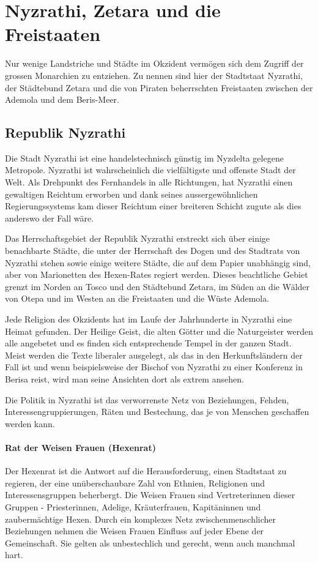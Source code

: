 \documentclass[12pt,twoside,twocolumn,openany]{book}
\begin{document}
\chapter{Nyzrathi, Zetara und die Freistaaten}
Nur wenige Landstriche und Städte im Okzident vermögen sich dem Zugriff der grossen Monarchien zu entziehen. Zu nennen sind hier der Stadtstaat Nyzrathi, der Städtebund Zetara und die von Piraten beherrschten Freistaaten zwischen der Ademola und dem Beris-Meer.

\section{Republik Nyzrathi}
Die Stadt Nyzrathi ist eine handelstechnisch günstig im Nyzdelta gelegene Metropole. Nyzrathi ist wahrscheinlich die vielfältigste und offenste Stadt der Welt. Als Drehpunkt des Fernhandels in alle Richtungen, hat Nyzrathi einen gewaltigen Reichtum erworben und dank seines aussergewöhnlichen Regierungssystems kam dieser Reichtum einer breiteren Schicht zugute als dies anderswo der Fall wäre.

Das Herrschaftsgebiet der Republik Nyzrathi erstreckt sich über einige benachbarte Städte, die unter der Herrschaft des Dogen und des Stadtrats von Nyzrathi stehen sowie einige weitere Städte, die auf dem Papier unabhängig sind, aber von Marionetten des Hexen-Rates regiert werden. Dieses beachtliche Gebiet grenzt im Norden an Tosco und den Städtebund Zetara, im Süden an die Wälder von Otepa und im Westen an die Freistaaten und die Wüste Ademola.

Jede Religion des Okzidents hat im Laufe der Jahrhunderte in Nyzrathi eine Heimat gefunden. Der Heilige Geist, die alten Götter und die Naturgeister werden alle angebetet und es finden sich entsprechende Tempel in der ganzen Stadt. Meist werden die Texte liberaler ausgelegt, als das in den Herkunftsländern der Fall ist und wenn beispielsweise der Bischof von Nyzrathi zu einer Konferenz in Berisa reist, wird man seine Ansichten dort als extrem ansehen.

Die Politik in Nyzrathi ist das verworrenste Netz von Beziehungen, Fehden, Interessengruppierungen, Räten und Bestechung, das je von Menschen geschaffen werden kann.

\subsubsection{Rat der Weisen Frauen (Hexenrat)} Der Hexenrat ist die Antwort auf die Herausforderung, einen Stadtstaat zu regieren, der eine unüberschaubare Zahl von Ethnien, Religionen und Interessensgruppen beherbergt. Die Weisen Frauen sind Vertreterinnen dieser Gruppen - Priesterinnen, Adelige, Kräuterfrauen, Kapitäninnen und zaubermächtige Hexen. Durch ein komplexes Netz zwischenmenschlicher Beziehungen nehmen die Weisen Frauen Einfluss auf jeder Ebene der Gemeinschaft. Sie gelten als unbestechlich und gerecht, wenn auch manchmal hart.
\end{document}
